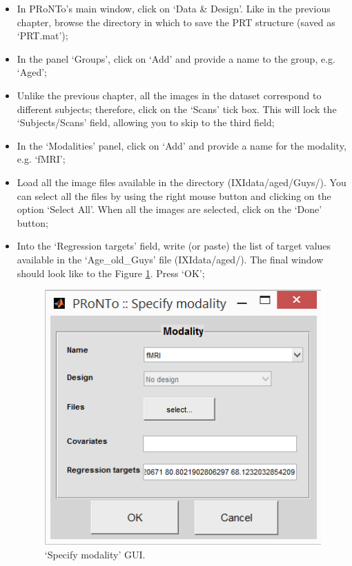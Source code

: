 \begin{itemize}

	\item In PRoNTo's main window, click on `Data \& Design'. Like in the previous chapter, browse the directory in which to save the PRT structure (saved as `PRT.mat');
	
	\item In the panel `Groups', click on `Add' and provide a name to the group, e.g. `Aged';

	\item Unlike the previous chapter, all the images in the dataset correspond to different subjects; therefore, click on the `Scans' tick box. This will lock the `Subjects/Scans' field, allowing you to skip to the third field;
	
	\item In the `Modalities' panel, click on `Add' and provide a name for the modality, e.g. `fMRI';
	
	\item Load all the image files available in the directory (IXIdata/aged/Guys/). You can select all the files by using the right mouse button and clicking on the option `Select All'. When all the images are selected, click on the `Done' button;
 
    \item Into the `Regression targets' field, write (or paste) the list of target values available in the `Age\_old\_Guys' file (IXIdata/aged/). The final window should look like to the Figure \ref{fig:specifyModalityReg}. Press `OK'; 

        \begin{figure}[h!]
            \begin{center}
                \includegraphics[scale=0.75]{images/Tutorial/regression/specifyModalityReg.png}
            \end{center}
            \caption{`Specify modality' GUI.}
            \label{fig:specifyModalityReg}
        \end{figure}


\end{itemize}
